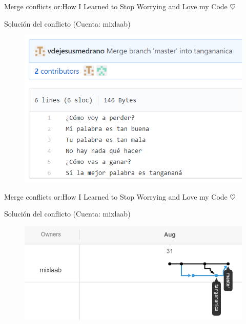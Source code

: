 \documentclass[10pt]{beamer}
\begin{document}
\begin{frame}{Merge conflicts or:}{How I Learned to Stop Worrying and Love my Code $\heartsuit$}

\begin{block}{Solución del conflicto (Cuenta: mixlaab)}

\begin{figure}[h!]
\centering
\includegraphics [scale=0.25]{final1}
\label{fig:issues}
\end{figure}
    
\end{block}

\end{frame}

\begin{frame}{Merge conflicts or:}{How I Learned to Stop Worrying and Love my Code $\heartsuit$}

\begin{block}{Solución del conflicto (Cuenta: mixlaab)}

\begin{figure}[h!]
\centering
\includegraphics [scale=0.45]{final2}
\label{fig:issues}
\end{figure}
    
\end{block}

\end{frame}
\end{document}
